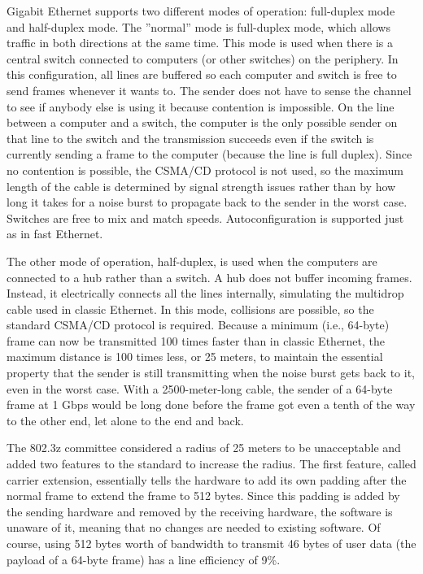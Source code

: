 \documentclass[b5paper,11pt]{memoir}
\begin{document}
Gigabit Ethernet supports two different modes of operation: full-duplex
mode and half-duplex mode. The ''normal'' mode is full-duplex mode,
which allows traffic in both directions at the same time. This mode is
used when there is a central switch connected to computers (or other
switches) on the periphery. In this configuration, all lines are
buffered so each computer and switch is free to send frames whenever it
wants to. The sender does not have to sense the channel to see if
anybody else is using it because contention is impossible. On the line
between a computer and a switch, the computer is the only possible
sender on that line to the switch and the transmission succeeds even if
the switch is currently sending a frame to the computer (because the
line is full duplex). Since no contention is possible, the CSMA/CD
protocol is not used, so the maximum length of the cable is determined
by signal strength issues rather than by how long it takes for a noise
burst to propagate back to the sender in the worst case. Switches are
free to mix and match speeds. Autoconfiguration is supported just as in
fast Ethernet.

The other mode of operation, half-duplex, is used when the computers are
connected to a hub rather than a switch. A hub does not buffer incoming
frames. Instead, it electrically connects all the lines internally,
simulating the multidrop cable used in classic Ethernet. In this mode,
collisions are possible, so the standard CSMA/CD protocol is required.
Because a minimum (i.e., 64-byte) frame can now be transmitted 100 times
faster than in classic Ethernet, the maximum distance is 100 times less,
or 25 meters, to maintain the essential property that the sender is
still transmitting when the noise burst gets back to it, even in the
worst case. With a 2500-meter-long cable, the sender of a 64-byte frame
at 1 Gbps would be long done before the frame got even a tenth of the
way to the other end, let alone to the end and back.

The 802.3z committee considered a radius of 25 meters to be unacceptable
and added two features to the standard to increase the radius. The first
feature, called {carrier extension}, essentially tells the hardware to
add its own padding after the normal frame to extend the frame to 512
bytes. Since this padding is added by the sending hardware and removed
by the receiving hardware, the software is unaware of it, meaning that
no changes are needed to existing software. Of course, using 512 bytes
worth of bandwidth to transmit 46 bytes of user data (the payload of a
64-byte frame) has a line efficiency of 9\%.
\end{document}
